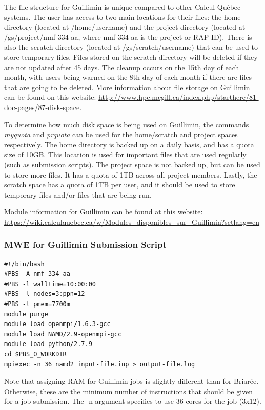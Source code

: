 \documentclass[12pt]{article}
\begin{document}
\quad The file structure for Guillimin is unique compared to other Calcul Qu\'{e}bec systems. The user has access to two main locations for their files: the home directory (located at /home/username) and the project directory (located at /gs/project/nmf-334-aa, where nmf-334-aa is the project or RAP ID). There is also the scratch directory (located at /gs/scratch/username) that can be used to store temporary files. Files stored on the scratch directory will be deleted if they are not updated after 45 days. The cleanup occurs on the 15th day of each month, with users being warned on the 8th day of each month if there are files that are going to be deleted. More information about file storage on Guillimin can be found on this website: \url{http://www.hpc.mcgill.ca/index.php/starthere/81-doc-pages/87-disk-space}.

\quad To determine how much disk space is being used on Guillimin, the commands \textit{myquota} and \textit{prquota} can be used for the home/scratch and project spaces respectively. The home directory is backed up on a daily basis, and has a quota size of 10GB. This location is used for important files that are used regularly (such as submission scripts). The project space is not backed up, but can be used to store more files. It has a quota of 1TB across all project members. Lastly, the scratch space has a quota of 1TB per user, and it should be used to store temporary files and/or files that are being run.

\quad Module information for Guillimin can be found at this website: \url{https://wiki.calculquebec.ca/w/Modules_disponibles_sur_Guillimin?setlang=en}

\subsubsection{MWE for Guillimin Submission Script}

\begin{lstlisting}
#!/bin/bash
#PBS -A nmf-334-aa
#PBS -l walltime=10:00:00
#PBS -l nodes=3:ppn=12
#PBS -l pmem=7700m
module purge
module load openmpi/1.6.3-gcc
module load NAMD/2.9-openmpi-gcc
module load python/2.7.9
cd $PBS_O_WORKDIR
mpiexec -n 36 namd2 input-file.inp > output-file.log
\end{lstlisting}

\quad Note that assigning RAM for Guillimin jobs is slightly different than for Briar\'{e}e. Otherwise, these are the minimum number of instructions that should be given for a job submission. The -n argument specifies to use 36 cores for the job (3x12).
\end{document}

